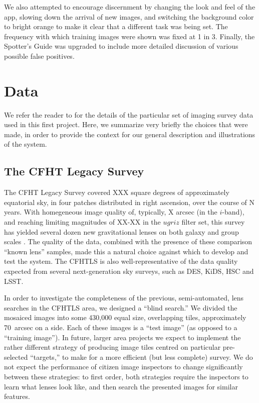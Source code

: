 \documentclass[useAMS,usenatbib,a4paper]{mn2e}
\begin{document}
We also attempted to encourage discernment by changing the look and feel of
the app, slowing down the arrival of new images, and switching the background
color to bright orange to make it clear that a different task was being set.
The frequency with which training images were shown was fixed at 1 in 3.
Finally, the Spotter's Guide was upgraded to include more detailed discussion
of various possible false positives.




\section{Data}
\label{sec:data}

We refer the reader to \papertwo for the details of the particular set of
imaging survey data used in this first \sw project. Here, we summarize very
briefly the choices that were made, in order to provide the context for our
general description and illustrations of the \sw system.


\subsection{The CFHT Legacy Survey}
\label{sec:data:CFHTLS}

The CFHT Legacy Survey \citep[CFHTLS,][]{CFHTLS} covered XXX square degrees of
approximately equatorial sky, in four patches distributed in right ascension,
over the course of N years. With homegeneous image quality of, typically, X
arcsec (in the $i$-band), and reaching limiting magnitudes of XX-XX in the
$ugriz$ filter set, this survey has yielded several dozen new gravitational
lenses on both galaxy and group scales \citep{}. The quality of the data,
combined with the presence of these comparison ``known lens'' samples, made
this a natural choice against which to develop and test the \sw system. The
CFHTLS is also well-representative of the data quality expected from several
next-generation sky surveys, such as DES, KiDS, HSC and LSST. 

In order to investigate the completeness of the previous, semi-automated, lens
searches in the CFHTLS area, we designed a ``blind search.'' We divided the
mosaiced images into some 430,000 equal size, overlapping tiles, approximately
70~arcsec on a side. Each of these images is a ``test image'' (as opposed to a
``training image''). In future, larger area projects we expect to implement
the rather different strategy of producing image tiles centred on particular
pre-selected ``targets,'' to make for a more efficient (but less complete)
survey. We do not expect the performance of citizen image inspectors to change
significantly between these strategies: to first order, both strategies
require the inspectors to learn what lenses look like, and then search the
presented images for similar features.
\end{document}
